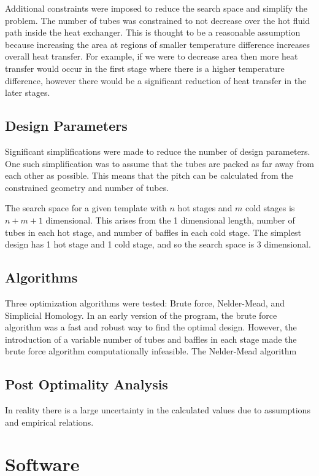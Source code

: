 \documentclass{article}
\begin{document}
Additional constraints were imposed to reduce the search space and simplify the problem.
The number of tubes was constrained to not decrease over the hot fluid path inside the heat exchanger.
This is thought to be a reasonable assumption because increasing the area at regions of smaller temperature difference increases overall heat transfer.
For example, if we were to decrease area then more heat transfer would occur in the first stage where there is a higher temperature difference, however there would be a significant reduction of heat transfer in the later stages.

\subsection{Design Parameters}

Significant simplifications were made to reduce the number of design parameters.
One such simplification was to assume that the tubes are packed as far away from each other as possible.
This means that the pitch can be calculated from the constrained geometry and number of tubes.

The search space for a given template with $n$ hot stages and $m$ cold stages is $n + m + 1$ dimensional.
This arises from the 1 dimensional length, number of tubes in each hot stage, and number of baffles in each cold stage.
The simplest design has 1 hot stage and 1 cold stage, and so the search space is 3 dimensional.

\subsection{Algorithms}
Three optimization algorithms were tested: Brute force, Nelder-Mead, and Simplicial Homology.
In an early version of the program, the brute force algorithm was a fast and robust way to find the optimal design.
However, the introduction of a variable number of tubes and baffles in each stage made the brute force algorithm computationally infeasible.
The Nelder-Mead algorithm

\subsection{Post Optimality Analysis}

In reality there is a large uncertainty in the calculated values due to assumptions and empirical relations.


\section{Software}
\end{document}
